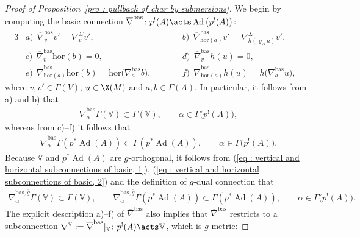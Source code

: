 \begin{proof}[Proof of Proposition~\ref{pro : pullback of char by submersions}]
 We begin by computing the basic connection $\overline{\nabla}^{\mathrm{bas}}\colon p^!(A) \acts \operatorname{Ad}\big(p^!(A)\big)$:
 \begin{alignat*}{3}
& a) \ \ \overline{\nabla}^{\mathrm{bas}}_vv'=\nabla^{\Sigma}_{v}v', \qquad && b) \ \ \overline{\nabla}^{\mathrm{bas}}_{\mathrm{hor}(a)}v'=\nabla^{\Sigma}_{h(\varrho_Aa)}v', & \\
& c) \ \ \overline{\nabla}^{\mathrm{bas}}_v\mathrm{hor}(b)=0, \qquad && d) \ \ \overline{\nabla}^{\mathrm{bas}}_vh(u)=0, & \\
& e) \ \ \overline{\nabla}^{\mathrm{bas}}_{\mathrm{hor}(a)}\mathrm{hor}(b)=\mathrm{hor}\big(\nabla^{\mathrm{bas}}_{a}b\big), \qquad && f) \ \
\overline{\nabla}^{\mathrm{bas}}_{\mathrm{hor}(a)}h(u)=h\big(\nabla^{\mathrm{bas}}_au\big), &
 \end{alignat*}where $v,v' \in \Gamma(V)$, $u \in \X(M)$ and $a,b \in \Gamma(A)$. In particular, it follows from a) and b) that
 \begin{gather}\label{eq : vertical and horizontal subconnections of basic, 1}
 \overline{\nabla}^{\mathrm{bas}}_{\alpha}\Gamma(\mathbb{V}) \subset \Gamma(\mathbb{V}), \qquad \alpha \in \Gamma\big(p^!(A)\big),
 \end{gather}whereas from c)--f) it follows that
 \begin{gather}\label{eq : vertical and horizontal subconnections of basic, 2}
 \overline{\nabla}^{\mathrm{bas}}_{\alpha}\Gamma(p^*\operatorname{Ad}(A)) \subset \Gamma(p^*\operatorname{Ad}(A)), \qquad \alpha \in \Gamma\big(p^!(A)\big).
 \end{gather}Because $\mathbb{V}$ and $p^*\operatorname{Ad}(A)$ are $\overline{g}$-orthogonal, it follows from (\ref{eq : vertical and horizontal subconnections of basic, 1}), (\ref{eq : vertical and horizontal subconnections of basic, 2}) and the definition of $\overline{g}$-dual connection that
 \begin{gather}\label{eq : vertical and horizontal subconnections of g-dual of basic}
 \overline{\nabla}^{\mathrm{bas},\overline{g}}_{\alpha}\Gamma(\mathbb{V}) \subset \Gamma(\mathbb{V}), \qquad \overline{\nabla}^{\mathrm{bas},\overline{g}}_{\alpha}\Gamma(p^*\operatorname{Ad}(A)) \subset \Gamma(p^*\operatorname{Ad}(A)), \qquad \alpha \in \Gamma\big(p^!(A)\big).
 \end{gather}
The explicit description a)--f) of $\overline{\nabla}^{\mathrm{bas}}$ also implies that $\overline{\nabla}^{\mathrm{bas}}$ restricts to a subconnection $\nabla^{\mathbb{V}}:=\overline{\nabla}^{\mathrm{bas}}|_{\mathbb{V}}\colon p^!(A) \acts \mathbb{V}$, which is $\overline{g}$-metric:

\end{proof}
